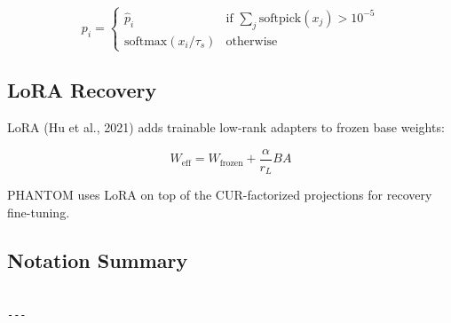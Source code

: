 \[
p_i = \begin{cases} \hat{p}_i & \text{if } \sum_j \text{softpick}(x_j) > 10^{-5} \\ \text{softmax}(x_i / \tau_s) & \text{otherwise} \end{cases}
\tag{3.11}
\]

\subsection{LoRA Recovery}

LoRA (Hu et al., 2021) adds trainable low-rank adapters to frozen base weights:

\[
W_\text{eff} = W_\text{frozen} + \frac{\alpha}{r_L} B A
\tag{3.12}
\]

PHANTOM uses LoRA on top of the CUR-factorized projections for recovery 
fine-tuning.

\subsection{Notation Summary}

\begin{lstlisting}

---
\end{lstlisting}